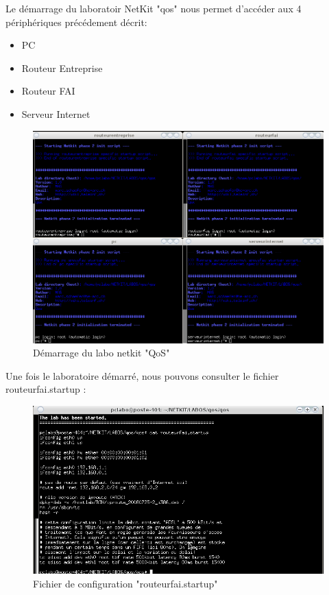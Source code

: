 \documentclass{article}
\begin{document}
Le démarrage du laboratoir NetKit "qos" nous permet d'accéder aux 4 périphériques précédement décrit:
\begin{itemize}
	\item PC
	\item Routeur Entreprise
	\item Routeur FAI
	\item Serveur Internet
\end{itemize}
\begin{figure}[h]
  \centering
  \includegraphics[width=\linewidth]{./captures/1-start.png}
  \caption{Démarrage du labo netkit "QoS"}
  \label{fig:qos}
\end{figure}

\newpage
Une fois le laboratoire démarré, nous pouvons consulter le fichier routeurfai.startup :
\begin{figure}[h]
  \centering
  \includegraphics[width=\linewidth]{./captures/2-RouteurfaiStartup.png}
  \caption{Fichier de configuration "routeurfai.startup"}
  \label{fig:token-bucket}
\end{figure}
\end{document}
